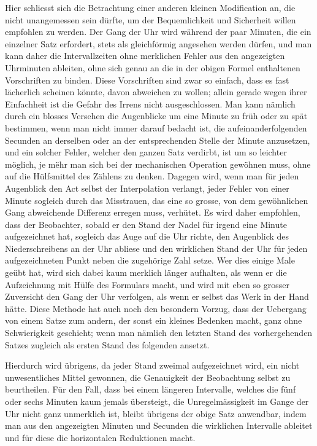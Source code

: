 \documentclass[12pt,a4paper]{article}
\begin{document}
Hier schliesst sich die Betrachtung einer anderen kleinen Modification an, die nicht unangemessen sein d\"urfte, um der Bequemlichkeit und Sicherheit willen empfohlen zu werden. Der Gang der Uhr wird w\"ahrend der paar Minuten, die ein einzelner Satz erfordert, stets als gleichf\"ormig angesehen werden d\"urfen, und man kann daher die Intervallzeiten ohne merklichen Fehler aus den angezeigten Uhrminuten ableiten, ohne sich genau an die in der obigen Formel enthaltenen Vorschriften zu binden. Diese Vorschriften sind zwar so einfach, dass es fast l\"acherlich scheinen k\"onnte, davon abweichen zu wollen; allein gerade wegen ihrer Einfachheit ist die Gefahr des Irrens nicht ausgeschlossen. Man kann n\"amlich durch ein blosses Versehen die Augenblicke um eine Minute zu fr\"uh oder zu sp\"at bestimmen, wenn man nicht immer darauf bedacht ist, die aufeinanderfolgenden Secunden an derselben oder an der entsprechenden Stelle der Minute anzusetzen, und ein solcher Fehler, welcher den ganzen Satz verdirbt, ist um so leichter m\"oglich, je m\"ehr man sich bei der mechanischen Operation gew\"ohnen muss, ohne auf die H\"ulfsmittel des Z\"ahlens zu denken. Dagegen wird, wenn man f\"ur jeden Augenblick den Act selbst der Interpolation verlangt, jeder Fehler von einer Minute sogleich durch das Misstrauen, das eine so grosse, von dem gew\"ohnlichen Gang abweichende Differenz erregen muss, verh\"utet. Es wird daher empfohlen, dass der Beobachter, sobald er den Stand der Nadel f\"ur irgend eine Minute aufgezeichnet hat, sogleich das Auge auf die Uhr richte, den Augenblick des Niederschreibens an der Uhr abliese und den wirklichen Stand der Uhr f\"ur jeden aufgezeichneten Punkt neben die zugeh\"orige Zahl setze. Wer dies einige Male ge\"ubt hat, wird sich dabei kaum merklich l\"anger aufhalten, als wenn er die Aufzeichnung mit H\"ulfe des Formulars macht, und wird mit eben so grosser Zuversicht den Gang der Uhr verfolgen, als wenn er selbst das Werk in der Hand h\"atte. Diese Methode hat auch noch den besondern Vorzug, dass der Uebergang von einem Satze zum andern, der sonst ein kleines Bedenken macht, ganz ohne Schwierigkeit geschieht; wenn man n\"amlich den letzten Stand des vorhergehenden Satzes zugleich als ersten Stand des folgenden ansetzt.

Hierdurch wird \"ubrigens, da jeder Stand zweimal aufgezeichnet wird, ein nicht unwesentliches Mittel gewonnen, die Genauigkeit der Beobachtung selbst zu beurtheilen. F\"ur den Fall, dass bei einem l\"angeren Intervalle, welches die f\"unf oder sechs Minuten kaum jemals \"ubersteigt, die Unregelm\"assigkeit im Gange der Uhr nicht ganz unmerklich ist, bleibt \"ubrigens der obige Satz anwendbar, indem man aus den angezeigten Minuten und Secunden die wirklichen Intervalle ableitet und f\"ur diese die horizontalen Reduktionen macht.
\end{document}
